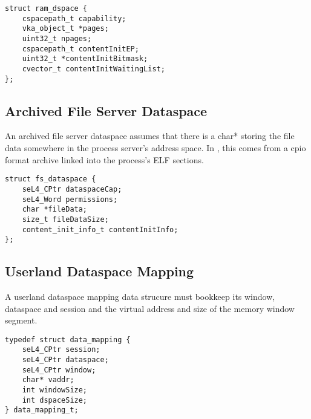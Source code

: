 \begin{verbatim}
struct ram_dspace {
    cspacepath_t capability;
    vka_object_t *pages;
    uint32_t npages;
    cspacepath_t contentInitEP;
    uint32_t *contentInitBitmask;
    cvector_t contentInitWaitingList;
};
\end{verbatim}

\subsection {Archived File Server Dataspace}

An archived file server dataspace assumes that there is a char* storing the file data somewhere in the process server's address space. In , this comes from a cpio format archive linked into the process's ELF sections.

\begin{verbatim}
struct fs_dataspace {
    seL4_CPtr dataspaceCap;
    seL4_Word permissions;
    char *fileData;
    size_t fileDataSize;
    content_init_info_t contentInitInfo;
};
\end{verbatim}

\subsection {Userland Dataspace Mapping}

A userland dataspace mapping data strucure must bookkeep its window, dataspace and session and the virtual address and size of the memory window segment.

\begin{verbatim}
typedef struct data_mapping {
    seL4_CPtr session;
    seL4_CPtr dataspace;
    seL4_CPtr window;
    char* vaddr;
    int windowSize;
    int dspaceSize;
} data_mapping_t;
\end{verbatim}
